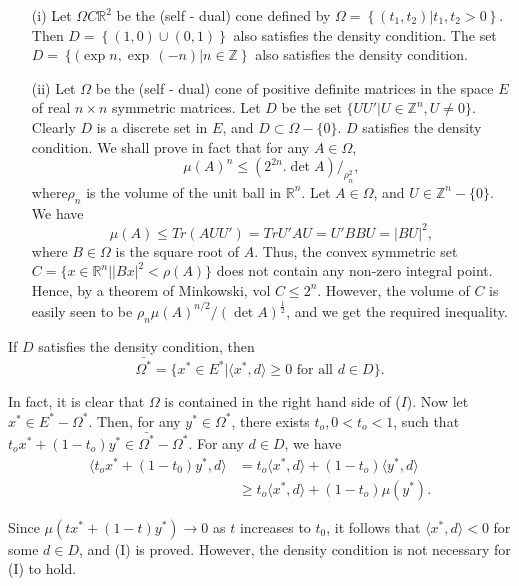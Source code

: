 \begin{examples*}
  \begin{itemize}
  \item[{\rm(i)}] Let $\Omega C \mathbb{R}^2 $ be the (self - dual) cone defined
    by $\Omega = \left\{ (t_1, t_2) \big| t_1 , t_2 > 0 \right\}$. Then $D =
    \left\{(1, 0)\cup (0, 1) \right\}$ also
    satisfies the density condition. The set $D= \left\{ (\exp n, \exp
    \,(-n) \big| n \in \mathbb{Z} \right\}$ also satisfies the density
    condition.  
 
  \item[{\rm(ii)}] Let $\Omega$ be the (self - dual) cone of positive definite
    matrices in the space $E$ of real $n \times n$ symmetric
    matrices. Let $D$ be the set $\{ U U' | U \in \mathbb{Z}^n, U
    \neq 0 \}$. Clearly $D$ is a discrete set in $E$, and $D
    \subset \Omega - \{0\}$. $D$ satisfies the density condition. We
    shall prove in fact that for any $A \in \Omega $,  
    $$
    \mu (A)^n \leq (2^{2n}. \det A)/_{\rho^2_n}, 
    $$
    where\pageoriginale $\rho_n$ is the volume of the unit ball in
    $\mathbb{R}^n$. Let 
    $A \in \Omega$, and $U \in \mathbb{Z}^n - \{ 0 \}$. We have  
    $$
    \mu (A) \leq Tr (A U U' ) = Tr U' A U = U'B B U = |BU|^2,  
    $$
    where $B \in \Omega$ is the square root of $A$. Thus, the convex
    symmetric set $C = \Big\{ x \in \mathbb{R}^n\big| |B x|^2 <
    \rho(A) \Big\}$ does
    not contain any non-zero integral point. Hence, by a theorem of
    Minkowski, vol $C \leq 2^n$. However, the volume of $C$ is easily seen
    to be $\rho_n \mu (A)^{n/2}/(\det A)^{\frac{1}{2}}$, and we get the
    required inequality.  
  \end{itemize}
\end{examples*}

\begin{remark*}
  If $D$ satisfies the density condition, then 
  \begin{equation*}
    \bar{\Omega^*} = \Bigg\{ x^* \in E^* \big| \langle x^* , d \rangle
    \geq 0
    \text{ for all } d \in D  \Bigg  \}. \tag{I} 
  \end{equation*}
  
  In fact, it is clear that $\Omega$ is contained in the right hand side
  of ($I$). Now let $x^* \in E^* - \Omega^*$. Then, for any $y^* \in
  \Omega^*$, there exists $t_o, 0 < t_o < 1$, such that $t_o x^* + (
  1-t_o) y^* \in \bar{\Omega^*} - \Omega^*$. For any $d \in D$, we have  
  \begin{align*}
    \langle t_o x^* + ( 1- t_0) y^* , d \rangle & = t_o \langle x^* , d
    \rangle  + ( 1 -t_o) \langle y^* ,d \rangle \\ 
    & \geq t_o \langle x^* , d \rangle + (1- t_o) \mu (y^*).
  \end{align*}
  
  Since $\mu (tx^* + (1-t)y^* )\to 0$ as $t$ increases to $t_0$, it
  follows that $\langle x^*, d \rangle < 0$ for some $d \in D$, and
  (I) is proved. However, the density condition is not necessary for
  (I) to hold.  
\end{remark*}


